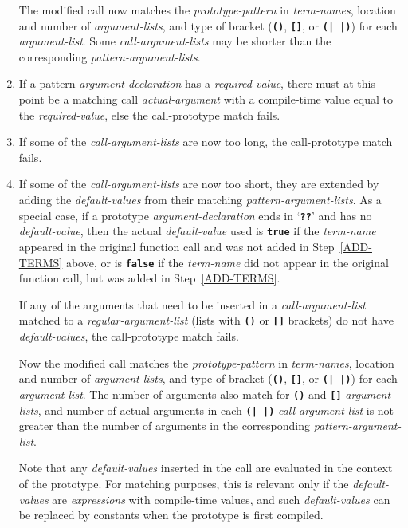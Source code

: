 \documentclass[12pt]{article}
\newcommand{\TT}[1]{{\tt \bfseries #1}}
\begin{document}
\begin{enumerate}
The modified call now matches
the {\em prototype-pattern} in {\em term-names},
location and number of {\em argument-lists}, and type of bracket (\TT{()},
\TT{[]}, or \TT{(|~|)}) for each {\em argument-list}.  Some
{\em call-argument-lists} may be shorter than the corresponding
{\em pattern-argument-lists}.

\item
If a pattern {\em argument-declaration} has a {\em required-value},
there must at this point be a matching call {\em actual-argument}
with a compile-time value equal to the {\em required-value},
else the call-prototype match fails.

\item
If some of the {\em call-argument-lists} are now too long, the call-prototype
match fails.

\item
If some of the {\em call-argument-lists} are now too short, they are extended
by adding the {\em default-values} from
their matching {\em pattern-argument-lists}.
As a special case, if a prototype {\em arg\-u\-ment-de\-clar\-a\-tion} ends in
`\TT{??}' and has no {\em default-value}, then the actual
{\em default-value} used is \TT{true} if the {\em term-name}
appeared in the original function call and was not added in
Step~\ref{ADD-TERMS} above, or is \TT{false} if the {\em term-name}
did not appear in the original function call, but was added in
Step~\ref{ADD-TERMS}.

If any of the arguments that need to be inserted in a
{\em call-argument-list} matched to a {\em regular-argument-list}
(lists with \TT{()} or \TT{[]} brackets)
do not have {\em default-values}, the call-prototype match fails.

Now the modified call matches
the {\em prototype-pattern} in {\em term-names},
location and number of {\em argument-lists}, and type of bracket (\TT{()},
\TT{[]}, or \TT{(|~|)}) for each {\em argument-list}.  The number of
arguments also match for \TT{()} and \TT{[]} {\em argument-lists},
and number of actual arguments in each \TT{(|~|)} {\em call-argument-list}
is not greater than the number of arguments in the corresponding
{\em pattern-argument-list}.

Note that any {\em default-values} inserted in the call
are evaluated in the context of the prototype.  For
matching purposes, this is relevant only if the {\em default-values}
are {\em expressions} with compile-time values, and such
{\em default-values} can be replaced by constants when the
prototype is first compiled.


\end{enumerate}
\end{document}
